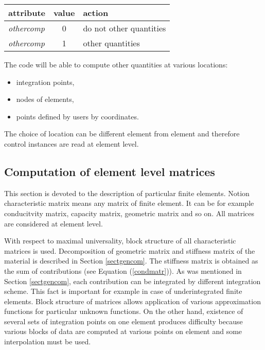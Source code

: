 \begin{center}
\begin{tabular}{|l|c|l|}
\hline
attribute & value & action
\\ \hline \hline
{\it othercomp} & 0 & do not other quantities
\\ \hline
{\it othercomp} & 1 & other quantities
\\ \hline
\end{tabular}
\label{tabothercompcontr}
\end{center}

The code will be able to compute other quantities at various locations:
\begin{itemize}
\item{integration points,}
\item{nodes of elements,}
\item{points defined by users by coordinates.}
\end{itemize}
The choice of location can be different element from element and therefore control instances are read
at element level.


\subsection{Computation of element level matrices}
This section is devoted to the description of particular finite elements. Notion characteristic
matrix  means any matrix of finite element. It can be for example
conducitvity matrix, capacity matrix, geometric matrix and so on. All matrices are considered at element level.

With respect to maximal universality, block structure of all characteristic matrices is used.
Decomposition of geometric matrix and stiffness matrix of the material is described in Section \ref{sectgencom}.
The stiffness matrix is obtained as the sum of contributions (see Equation (\ref{condmatr})).
As was mentioned in Section \ref{sectgencom}, each contribution can be integrated by different integration
scheme. This fact is important for example in case of underintegrated finite elements. Block structure of
matrices allows application of various approximation functions for particular unknown functions.
On the other hand, existence of several sets of integration points on one element produces difficulty because
various blocks of data are computed at various points on element and some interpolation must be used. 

